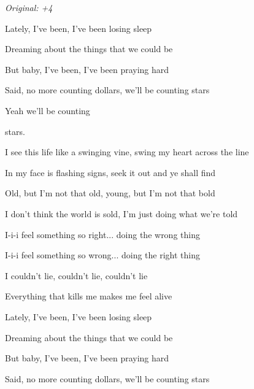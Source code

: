 \begin{song}


\begin{strumbox}
\textit{Original: +4}
\end{strumbox}

\begin{vchordbox}
\vspace{2em}
\end{vchordbox}


\bigskip

Lately, I've been, I've been losing sleep \par
{} Dreaming about the things that we could be \par
But baby, I've been, I've been praying hard \par
{} Said, no more counting dollars, we'll be counting stars \par
{} Yeah we'll be counting  \par

\bigskip

stars.    \par

\bigskip

I see this life like a swinging vine, swing my heart across the line \par
{}In my face is flashing signs,  seek it out and ye shall find \par
{}Old, but I'm not that old, young, but I'm not that bold \par
{}I don't think the world is sold,  I'm just doing what we're told \par

\bigskip

 I-i-i feel something so right... doing the wrong thing \par
{} I-i-i feel something so wrong... doing the right thing \par
{} I couldn't lie, couldn't lie, couldn't lie \par
{}Everything that kills me makes me feel alive \par

\bigskip

\begin{chorusbox}{\Chorus}
Lately, I've been, I've been losing sleep \par
{} Dreaming about the things that we could be \par
But baby, I've been, I've been praying hard \par
{} Said, no more counting dollars, we'll be counting stars \par


\end{chorusbox}
\end{song}
